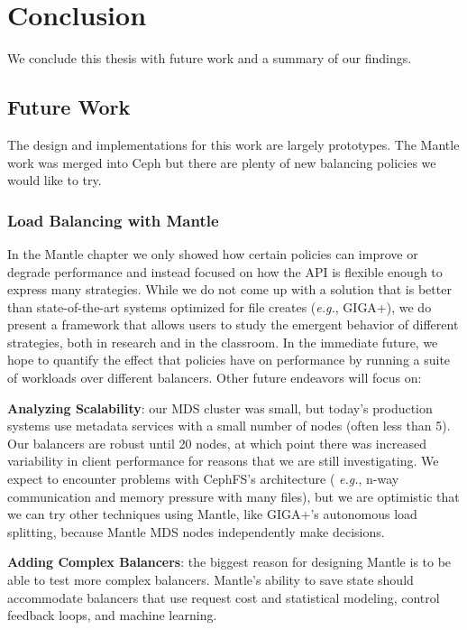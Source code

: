 \chapter{Conclusion}
\label{chp:conclusion}

We conclude this thesis with future work and a summary of our findings.

\section{Future Work}

The design and implementations for this work are largely prototypes. The Mantle
work was merged into Ceph but there are plenty of new balancing policies we
would like to try.

\subsection{Load Balancing with Mantle}

In the Mantle chapter we only showed how certain policies can improve or degrade
performance and instead focused on how the API is flexible enough to express many
strategies.  While we do not come up with a solution that is better than
state-of-the-art systems optimized for file creates ({\it e.g.}, GIGA+), we do
present a framework that allows users to study the emergent behavior of
different strategies, both in research and in the classroom. In the immediate
future, we hope to quantify the effect that policies have on performance by
running a suite of workloads over different balancers. Other future endeavors
will focus on:

\textbf{Analyzing Scalability}: our MDS cluster was small, but today's
production systems use metadata services with a small number of nodes (often
less than 5). Our balancers are robust until 20 nodes, at which point there was
increased variability in client performance for reasons that we are still
investigating. We expect to encounter problems with CephFS's architecture ({\it
e.g.}, n-way communication and memory pressure with many files), but we are
optimistic that we can try other techniques using Mantle, like GIGA+'s
autonomous load splitting, because Mantle MDS nodes independently make
decisions. 


\textbf{Adding Complex Balancers}: the biggest reason for designing Mantle is
to be able to test more complex balancers. Mantle's ability to save state
should accommodate balancers that use request cost and statistical modeling,
control feedback loops, and machine learning.

